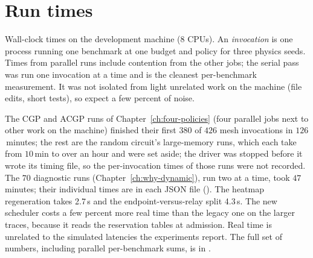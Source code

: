 \chapter{Run times}
\label{ch:runtimes}

Wall-clock times on the development machine (8 CPUs). An \emph{invocation} is one process running one benchmark at one budget and policy for three physics seeds.
Times from parallel runs include contention from the other jobs; the serial pass was run one invocation at a time and is the cleanest per-benchmark measurement. It was not isolated from light unrelated work on the machine (file edits, short tests), so expect a few percent of noise.


The CGP and ACGP runs of Chapter~\ref{ch:four-policies} (four parallel jobs next to other work on the machine) finished their first $380$ of $426$ mesh invocations in $126$\,minutes; the rest are the random circuit's large-memory runs, which each take from $10$\,min to over an hour and were set aside; the driver was stopped before it wrote its timing file, so the per-invocation times of those runs were not recorded. The $70$ diagnostic runs (Chapter~\ref{ch:why-dynamic}), run two at a time, took $47$\,minutes; their individual times are in each JSON file (). The heatmap regeneration takes 2.7\,s and the endpoint-versus-relay split 4.3\,s. The new scheduler costs a few percent more real time than the legacy one on the larger traces, because it reads the
reservation tables at admission. Real time is unrelated to the simulated latencies the experiments report. The full set of numbers, including parallel per-benchmark sums, is in .
